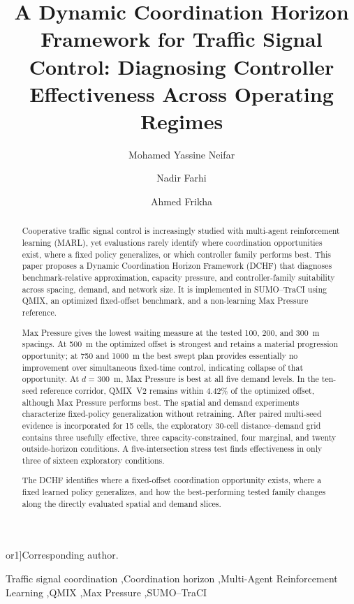 \documentclass[review,12pt]{elsarticle}
\def\corref#1{}%
\def\cortext#1#2{}%
\def\ead#1{}%
\begin{document}
\hypersetup{pageanchor=false}
\begin{frontmatter}

\title{A Dynamic Coordination Horizon Framework for Traffic Signal Control: Diagnosing Controller Effectiveness Across Operating Regimes}

\author[inst1]{Mohamed Yassine Neifar\corref{cor1}}
\ead{yessine.neifar.imsil@isgis.usf.tn}
\cortext[cor1]{Corresponding author.}
\author[inst1]{Nadir Farhi}
\author[inst2]{Ahmed Frikha}
\address[inst1]{Universit\'e Gustave Eiffel, COSYS--GRETTIA,
14--20 Boulevard Newton, Cit\'e Descartes, Champs-sur-Marne,
F-77447 Marne-la-Vall\'ee Cedex 2, France}

\address[inst2]{Institut Sup\'erieur de Gestion Industrielle de Sfax,
OLID, University of Sfax, Route de l'A\'eroport km 4, BP 1099,
Sfax 3038, Tunisia}

\begin{abstract}
Cooperative traffic signal control is increasingly studied with
multi-agent reinforcement learning (MARL), yet evaluations rarely
identify where coordination opportunities exist, where a fixed policy
generalizes, or which controller family performs best. This paper
proposes a Dynamic Coordination Horizon Framework (DCHF) that diagnoses
benchmark-relative approximation, capacity pressure, and controller-family
suitability across spacing, demand, and network size. It is implemented
in SUMO--TraCI using QMIX, an optimized fixed-offset benchmark, and a
non-learning Max Pressure reference.

Max Pressure gives the
lowest waiting measure at the tested 100, 200, and 300~m spacings. At
500~m the optimized offset is strongest and retains a material
progression opportunity; at 750 and 1000~m the best swept plan provides
essentially no improvement over simultaneous fixed-time control,
indicating collapse of that opportunity. At $d=300$~m, Max Pressure is
best at all five demand levels. In the ten-seed reference corridor,
QMIX~V2 remains within $4.42\%$ of the optimized offset, although Max
Pressure performs best. The spatial and demand experiments characterize
fixed-policy generalization without retraining. After paired multi-seed evidence is
incorporated for 15 cells, the exploratory 30-cell distance--demand grid
contains three usefully effective, three capacity-constrained, four
marginal, and twenty outside-horizon conditions. A five-intersection
stress test finds effectiveness in only three of sixteen exploratory
conditions.

The DCHF identifies where a fixed-offset coordination opportunity
exists, where a fixed learned policy generalizes, and how the
best-performing tested family changes along the directly evaluated
spatial and demand slices.
\end{abstract}
\begin{keyword}
Traffic signal coordination \sep Coordination horizon \sep Multi-Agent Reinforcement Learning \sep QMIX \sep Max Pressure \sep SUMO--TraCI
\end{keyword}

\end{frontmatter}
\hypersetup{pageanchor=true}
\end{document}
